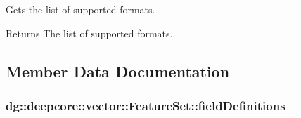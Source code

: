 Gets the list of supported formats. 

\begin{DoxyReturn}{Returns}
The list of supported formats. 
\end{DoxyReturn}


\subsection{Member Data Documentation}
\subsubsection[{\texorpdfstring{field\+Definitions\+\_\+}{fieldDefinitions_}}]{ dg\+::deepcore\+::vector\+::\+Feature\+Set\+::field\+Definitions\+\_\+\hspace{0.3cm}{\ttfamily [protected]}}\hypertarget{classdg_1_1deepcore_1_1vector_1_1_feature_set_a0fdfbe8046808f547dd24594b45be9cf}{}\label{classdg_1_1deepcore_1_1vector_1_1_feature_set_a0fdfbe8046808f547dd24594b45be9cf}
